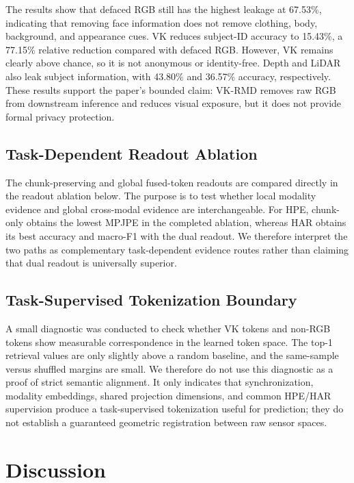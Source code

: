 ﻿\documentclass[journal]{IEEEtran}
\newcommand{\method}{VK-RMD}
\begin{document}
The results show that defaced RGB still has the highest leakage at 67.53\%, indicating that removing face information does not remove clothing, body, background, and appearance cues. VK reduces subject-ID accuracy to 15.43\%, a 77.15\% relative reduction compared with defaced RGB. However, VK remains clearly above chance, so it is not anonymous or identity-free. Depth and LiDAR also leak subject information, with 43.80\% and 36.57\% accuracy, respectively. These results support the paper's bounded claim: \method{} removes raw RGB from downstream inference and reduces visual exposure, but it does not provide formal privacy protection.

\subsection{Task-Dependent Readout Ablation}
The chunk-preserving and global fused-token readouts are compared directly in the readout ablation below. The purpose is to test whether local modality evidence and global cross-modal evidence are interchangeable. For HPE, chunk-only obtains the lowest MPJPE in the completed ablation, whereas HAR obtains its best accuracy and macro-F1 with the dual readout. We therefore interpret the two paths as complementary task-dependent evidence routes rather than claiming that dual readout is universally superior.



\subsection{Task-Supervised Tokenization Boundary}
A small diagnostic was conducted to check whether VK tokens and non-RGB tokens show measurable correspondence in the learned token space. The top-1 retrieval values are only slightly above a random baseline, and the same-sample versus shuffled margins are small. We therefore do not use this diagnostic as a proof of strict semantic alignment. It only indicates that synchronization, modality embeddings, shared projection dimensions, and common HPE/HAR supervision produce a task-supervised tokenization useful for prediction; they do not establish a guaranteed geometric registration between raw sensor spaces.

\section{Discussion}
\end{document}
